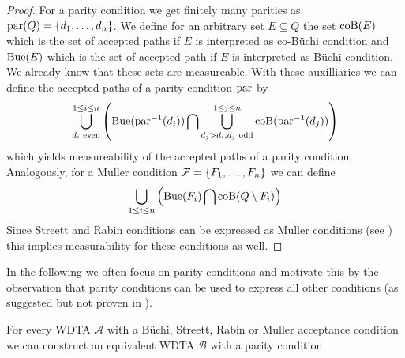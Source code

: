 \begin{proof}
  For a parity condition we get finitely many parities as
  $\operatorname{par}(Q) = \left\{d_{1},\dots,d_{n}\right\}$. We define for an arbitrary set
  $E\subseteq Q$ the set $\operatorname{coB}(E)$ which is the set of accepted paths if
  $E$ is interpreted as co-Büchi condition and $\operatorname{Bue}(E)$ which is the set of
  accepted path if $E$ is interpreted as Büchi condition. We already know that
  these sets are measureable. With these auxilliaries we can define the
  accepted paths of a parity condition $\operatorname{par}$ by
  \begin{equation}
    \bigcup\limits^{1\leq i\leq n}_{d_{i}\text{ even}}\left(\operatorname{Bue}(\operatorname{par}^{-1}(d_{i}))
    \bigcap\bigcup\limits^{1\leq j\leq n}_{d_{j} > d_{i}, d_{j}\text{ odd}}
    \operatorname{coB}(\operatorname{par}^{-1}(d_{j}))\right)
  \end{equation}
  which yields measureability of the accepted paths of a parity condition.
  Analogously, for a Muller condition $\mathcal{F} = \left\{F_{1},\dots,F_{n}\right\}$
  we can define
  \begin{equation}
    \bigcup\limits_{1\leq i\leq n}
    \left(\operatorname{Bue}(F_{i})\bigcap\operatorname{coB}(Q\setminus F_{i})\right)
  \end{equation}
  Since Streett and Rabin conditions can be expressed as Muller conditions
  (see \cite[Proposition 5.3]{LangAutoLog}) this implies measurability for
  these conditions as well.
\end{proof}
In the following we often focus on parity conditions and motivate this by the
observation that parity conditions can be used to express all other conditions
(as suggested but not proven in \cite[page 24:9]{RandAutoInfTrees}).
\begin{lemma}
  For every \ac{WDTA} $\mathcal{A}$ with a Büchi, Streett, Rabin or Muller
  acceptance condition we can construct an equivalent \ac{WDTA} $\mathcal{B}$
  with a parity condition.
\end{lemma}
